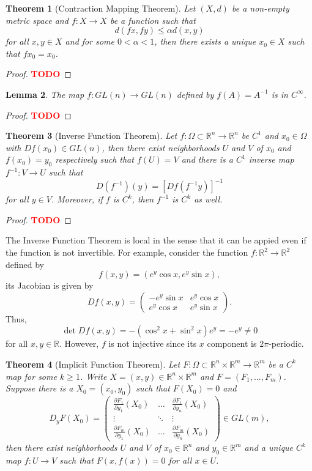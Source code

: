 \documentclass{article}
\theoremstyle{plain}
\newtheorem{theorem}{Theorem}[subsection]
\newtheorem{lemma}[theorem]{Lemma}
\theoremstyle{definition}
\newcommand{\R}{\mathbb{R}}
\newcommand{\td}{\textcolor{red}{\textbf{TODO}}}
\begin{document}
\begin{theorem}[Contraction Mapping Theorem]
    Let $(X, d)$ be a non-empty metric space and $f : X \to X$ be a function such that 
    $$d(fx, fy) \leq \alpha d(x,y)$$
    for all $x,y \in X$ and for some $0 < \alpha < 1$, then there exists a unique $x_0 \in X$ such that $fx_0 = x_0$.
\end{theorem}

\begin{proof}
    \td 
\end{proof}

\begin{lemma}
    The map $f: GL(n) \to GL(n)$ defined by $f(A) = A^{-1}$ is in $C^{\infty}$.
\end{lemma}

\begin{proof}
    \td 
\end{proof}

\begin{theorem}[Inverse Function Theorem]
    Let $f : \Omega \subset \R^n \to \R^n$ be $C^1$ and $x_0 \in \Omega$ with $Df(x_0) \in GL(n)$, then there exist neighborhoods $U$ and $V$ of $x_0$ and $f(x_0) = y_0$ respectively such that $f(U) = V$ and there is a $C^1$ inverse map $f^{-1} : V \to U$ such that
    $$D(f^{-1})(y) = [Df(f^{-1}y)]^{-1}$$
    for all $y \in V$. Moreover, if $f$ is $C^k$, then $f^{-1}$ is $C^k$ as well.
\end{theorem}

\begin{proof}
    \td 
\end{proof}

The Inverse Function Theorem is local in the sense that it can be appied even if the function is not invertible. For example, consider the function $f: \R^2 \to \R^2$ defined by
$$f(x,y) = (e^y \cos x, e^y \sin x),$$
its Jacobian is given by
$$Df(x,y) = \begin{pmatrix}
    -e^y \sin x & e^y \cos x \\ e^y \cos x & e^y \sin x
\end{pmatrix}.$$
Thus, 
$$\det Df(x,y) = -(\cos^2x + \sin^2 x)e^y = - e^y \neq 0$$
for all $x,y \in \R$. However, $f$ is not injective since its $x$ component is $2\pi$-periodic.

\begin{theorem}[Implicit Function Theorem]
    Let $F : \Omega \subset \R^n \times \R^m \to \R^m$ be a $C^k$ map for some $k \geq 1$. Write $X = (x,y) \in \R^n \times \R^m$ and $F = (F_1, ..., F_m)$. Suppose there is a $X_0 = (x_0, y_0)$ such that $F(X_0) = 0$ and
    $$D_yF(X_0) = \begin{pmatrix}
        \frac{\partial F_1}{\partial y_1}(X_0) & \dots & \frac{\partial F_1}{\partial y_n}(X_0) \\ \vdots & \ddots & \vdots \\ \frac{\partial F_m}{\partial y_1}(X_0) & \dots & \frac{\partial F_m}{\partial y_n}(X_0)
    \end{pmatrix} \in GL(m),$$
    then there exist neighborhoods $U$ and $V$ of $x_0 \in \R^n$ and $y_0 \in \R^m$ and a unique $C^k$ map $f : U \to V$ such that $F(x, f(x)) = 0$ for all $x \in U$. 
\end{theorem}
\end{document}

